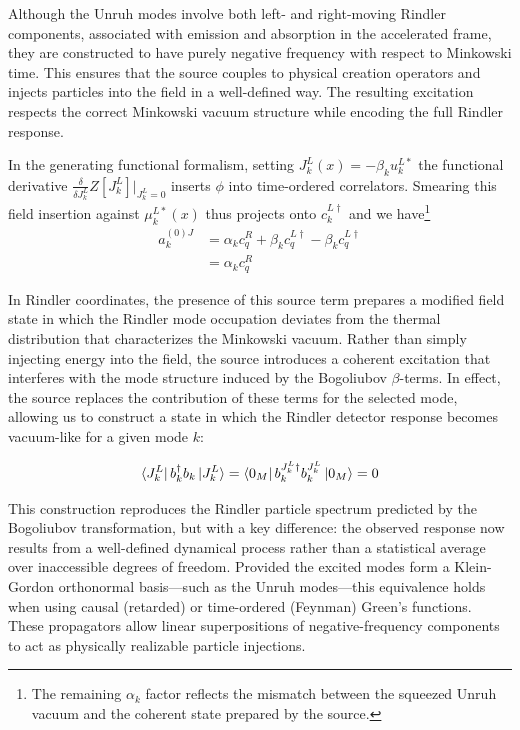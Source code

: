 \documentclass[12pt,a4paper]{article}
\begin{document}
Although the Unruh modes involve both left- and right-moving Rindler components, associated with emission and absorption in the accelerated frame, they are constructed to have purely negative frequency with respect to Minkowski time. This ensures that the source couples to physical creation operators and injects particles into the field in a well-defined way. The resulting excitation respects the correct Minkowski vacuum structure while encoding the full Rindler response.

In the generating functional formalism, setting $J_k^L(x) = -\beta_k u_k^{L*}$ the functional derivative $\frac{\delta}{\delta J_k^L}Z[J_k^L]|_{J_k^L=0}$ inserts $\phi$ into time-ordered correlators. Smearing this field insertion against $\mu_k^{L*}(x)$ thus projects onto $c_k^{L\dagger}$ and we have\footnote{The remaining $\alpha_k$ factor reflects the mismatch between the squeezed Unruh vacuum and the coherent state prepared by the source.}
\begin{equation}
\begin{array}{ll}
  a_k^{(0)J} &= \alpha_k c_q^R + \beta_k c_q^{L\dagger} -  \beta_k c_q^{L\dagger} \\
  &= \alpha_k c_q^R
\end{array}
\end{equation}

In Rindler coordinates, the presence of this source term prepares a modified field state in which the Rindler mode occupation deviates from the thermal distribution that characterizes the Minkowski vacuum. Rather than simply injecting energy into the field, the source introduces a coherent excitation that interferes with the mode structure induced by the Bogoliubov $\beta$-terms. In effect, the source replaces the contribution of these terms for the selected mode, allowing us to construct a state in which the Rindler detector response becomes vacuum-like for a given mode $k$:

\begin{equation}
  \bra{J_k^L}  b_k^{\dagger} b_k \ket{J_k^L} = \bra{0_M}  b_k^{J_k^L \dagger} b^{J_k^L}_k \ket{0_M} = 0
\end{equation}

This construction reproduces the Rindler particle spectrum predicted by the Bogoliubov transformation, but with a key difference: the observed response now results from a well-defined dynamical process rather than a statistical average over inaccessible degrees of freedom. Provided the excited modes form a Klein-Gordon orthonormal basis—such as the Unruh modes—this equivalence holds when using causal (retarded) or time-ordered (Feynman) Green’s functions. These propagators allow linear superpositions of negative-frequency components to act as physically realizable particle injections.
\end{document}
